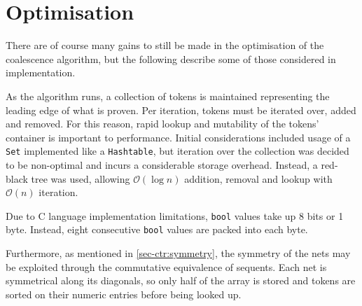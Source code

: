 \section{Optimisation}

    There are of course many gains to still be made in the optimisation of the coalescence algorithm, but the following describe some of those considered in implementation.

    \begin{remark*}
        As the algorithm runs, a collection of tokens is maintained representing the leading edge of what is proven.
        Per iteration, tokens must be iterated over, added and removed.
        For this reason, rapid lookup and mutability of the tokens' container is important to performance.
        Initial considerations included usage of a \texttt{Set} implemented like a \texttt{Hashtable}, but iteration over the collection was decided to be non-optimal and incurs a considerable storage overhead.
        Instead, a red-black tree was used, allowing $\mathcal{O}(\log n)$ addition, removal and lookup with $\mathcal{O}(n)$ iteration.
    \end{remark*}


    \begin{remark*}
        Due to C language implementation limitations, \texttt{bool} values take up 8 bits or 1 byte.
        Instead, eight consecutive \texttt{bool} values are packed into each byte.

        Furthermore, as mentioned in \ref{sec-ctr:symmetry}, the symmetry of the nets may be exploited through the commutative equivalence of sequents.
        Each net is symmetrical along its diagonals, so only half of the array is stored and tokens are sorted on their numeric entries before being looked up.
    \end{remark*}


    \begin{remark*}

    \end{remark*}


    \begin{remark*}

    \end{remark*}


